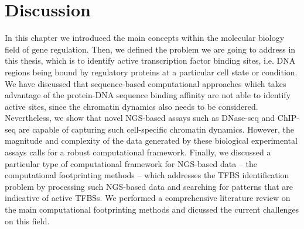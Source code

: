 \section{Discussion}
\label{sec:discussion.2}

In this chapter we introduced the main concepts within the molecular biology field of gene regulation. Then, we defined the problem we are going to address in this thesis, which is to identify active transcription factor binding sites, i.e. DNA regions being bound by regulatory proteins at a particular cell state or condition. We have discussed that sequence-based computational approaches which takes advantage of the protein-DNA sequence binding affinity are not able to identify active sites, since the chromatin dynamics also needs to be considered. Nevertheless, we show that novel NGS-based assays such as DNase-seq and ChIP-seq are capable of capturing such cell-specific chromatin dynamics. However, the magnitude and complexity of the data generated by these biological experimental assays calls for a robust computational framework. Finally, we discussed a particular type of computational framework for NGS-based data -- the computational footprinting methods -- which addresses the TFBS identification problem by processing such NGS-based data and searching for patterns that are indicative of active TFBSs. We performed a comprehensive literature review on the main computational footprinting methods and dicussed the current challenges on this field.


